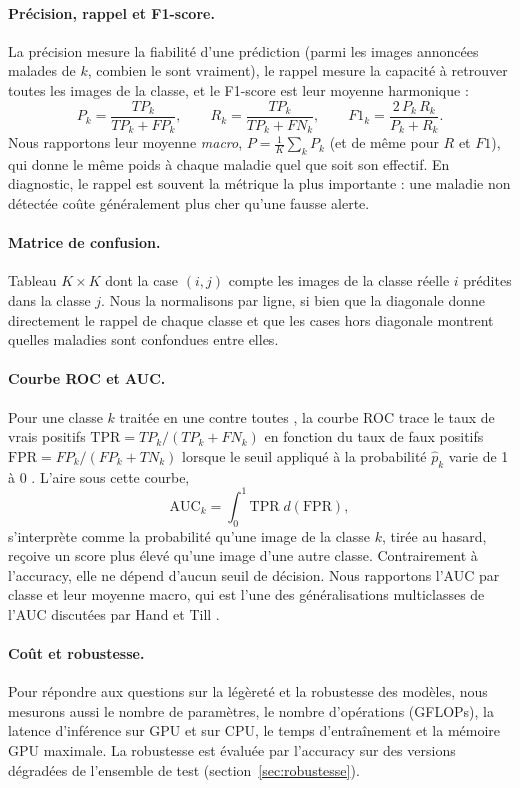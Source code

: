 \paragraph{Précision, rappel et F1-score.} La précision mesure la fiabilité d'une prédiction (parmi les images annoncées malades de $k$, combien le sont vraiment), le rappel mesure la capacité à retrouver toutes les images de la classe, et le F1-score est leur moyenne harmonique :
\begin{equation}
P_k = \frac{TP_k}{TP_k + FP_k}, \qquad R_k = \frac{TP_k}{TP_k + FN_k}, \qquad F1_k = \frac{2\,P_k\,R_k}{P_k + R_k}.
\end{equation}
Nous rapportons leur moyenne \emph{macro}, $P = \frac{1}{K}\sum_k P_k$ (et de même pour $R$ et $F1$), qui donne le même poids à chaque maladie quel que soit son effectif. En diagnostic, le rappel est souvent la métrique la plus importante : une maladie non détectée coûte généralement plus cher qu'une fausse alerte.

\paragraph{Matrice de confusion.} Tableau $K\times K$ dont la case $(i,j)$ compte les images de la classe réelle $i$ prédites dans la classe $j$. Nous la normalisons par ligne, si bien que la diagonale donne directement le rappel de chaque classe et que les cases hors diagonale montrent quelles maladies sont confondues entre elles.

\paragraph{Courbe ROC et AUC.} Pour une classe $k$ traitée en \og une contre toutes \fg{}, la courbe ROC trace le taux de vrais positifs $\mathrm{TPR}=TP_k/(TP_k+FN_k)$ en fonction du taux de faux positifs $\mathrm{FPR}=FP_k/(FP_k+TN_k)$ lorsque le seuil appliqué à la probabilité $\hat{p}_k$ varie de 1 à 0 \cite{fawcett2006introduction}. L'aire sous cette courbe,
\begin{equation}
\mathrm{AUC}_k = \int_{0}^{1} \mathrm{TPR}\; d(\mathrm{FPR}),
\end{equation}
s'interprète comme la probabilité qu'une image de la classe $k$, tirée au hasard, reçoive un score plus élevé qu'une image d'une autre classe. Contrairement à l'accuracy, elle ne dépend d'aucun seuil de décision. Nous rapportons l'AUC par classe et leur moyenne macro, qui est l'une des généralisations multiclasses de l'AUC discutées par Hand et Till \cite{hand2001simple}.

\paragraph{Coût et robustesse.} Pour répondre aux questions sur la légèreté et la robustesse des modèles, nous mesurons aussi le nombre de paramètres, le nombre d'opérations (GFLOPs), la latence d'inférence sur GPU et sur CPU, le temps d'entraînement et la mémoire GPU maximale. La robustesse est évaluée par l'accuracy sur des versions dégradées de l'ensemble de test (section~\ref{sec:robustesse}).
